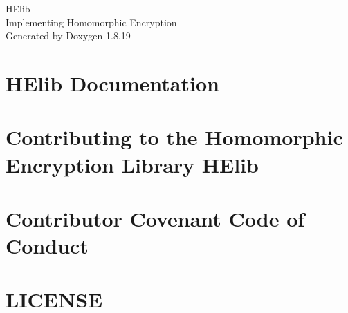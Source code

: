 \let\mypdfximage\pdfximage\def\pdfximage{\immediate\mypdfximage}\documentclass[twoside]{book}
\newcommand{\+}{\discretionary{\mbox{\scriptsize$\hookleftarrow$}}{}{}}
\newcommand{\clearemptydoublepage}{%
  \newpage{\pagestyle{empty}\cleardoublepage}%
}
\begin{document}
\hypersetup{pageanchor=false,
             bookmarksnumbered=true,
             pdfencoding=unicode
            }
\begin{titlepage}
\vspace*{7cm}
\begin{center}%
{\Large H\+Elib \\[1ex]\large Implementing Homomorphic Encryption }\\
\vspace*{1cm}
{\large Generated by Doxygen 1.8.19}\\
\end{center}
\end{titlepage}
\clearemptydoublepage
{}
\tableofcontents
\clearemptydoublepage
{}
\hypersetup{pageanchor=true}

\chapter{H\+Elib Documentation}
\label{index}\hypertarget{index}{}
\chapter{Contributing to the Homomorphic Encryption Library H\+Elib}
\label{md___users__projects__f_h_e__h_elib__repos__public_staging_homenc__h_elib__c_o_n_t_r_i_b_u_t_i_n_g}

\chapter{Contributor Covenant Code of Conduct}
\label{md___users__projects__f_h_e__h_elib__repos__public_staging_homenc__h_elib__c_o_d_e__o_f__c_o_n_d_u_c_t}

\chapter{L\+I\+C\+E\+N\+SE}
\label{md___users__projects__f_h_e__h_elib__repos__public_staging_homenc__h_elib__l_i_c_e_n_s_e}

\end{document}
